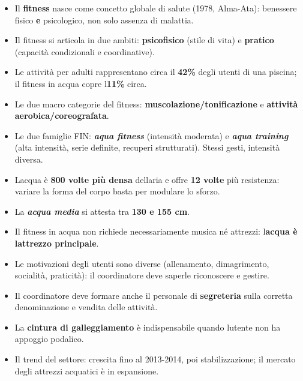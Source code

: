 \documentclass[a4paper,11pt]{article}
\providecommand{\tightlist}{%
  \setlength{\itemsep}{0pt}\setlength{\parskip}{0pt}}
\begin{document}
\begin{itemize}
      \tightlist
      \item
            Il \textbf{fitness} nasce come concetto globale di salute (1978,
            Alma-Ata): benessere fisico \textbf{e} psicologico, non solo assenza
            di malattia.
      \item
            Il fitness si articola in due ambiti: \textbf{psicofisico} (stile di
            vita) e \textbf{pratico} (capacità condizionali e coordinative).
      \item
            Le attività per adulti rappresentano circa il \textbf{42\%} degli
            utenti di una piscina; il fitness in acqua copre
            l\textquotesingle{}\textbf{11\%} circa.
      \item
            Le due macro categorie del fitness:
            \textbf{muscolazione/tonificazione} e \textbf{attività
                  aerobica/coreografata}.
      \item
            Le due famiglie FIN: \textbf{\emph{aqua fitness}} (intensità moderata)
            e \textbf{\emph{aqua training}} (alta intensità, serie definite,
            recuperi strutturati). Stessi gesti, intensità diversa.
      \item
            L\textquotesingle acqua è \textbf{800 volte più densa}
            dell\textquotesingle aria e offre \textbf{12 volte} più resistenza:
            variare la forma del corpo basta per modulare lo sforzo.
      \item
            La \textbf{\emph{acqua media}} si attesta tra \textbf{130 e 155 cm}.
      \item
            Il fitness in acqua non richiede necessariamente musica né attrezzi:
            l\textquotesingle{}\textbf{acqua è l\textquotesingle attrezzo
                  principale}.
      \item
            Le motivazioni degli utenti sono diverse (allenamento, dimagrimento,
            socialità, praticità): il coordinatore deve saperle riconoscere e
            gestire.
      \item
            Il coordinatore deve formare anche il personale di \textbf{segreteria}
            sulla corretta denominazione e vendita delle attività.
      \item
            La \textbf{cintura di galleggiamento} è indispensabile quando
            l\textquotesingle utente non ha appoggio podalico.
      \item
            Il trend del settore: crescita fino al 2013-2014, poi stabilizzazione;
            il mercato degli attrezzi acquatici è in espansione.
\end{itemize}
\end{document}

